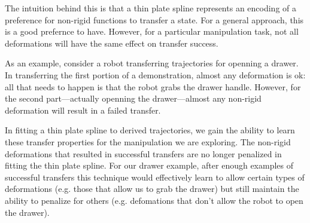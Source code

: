 The intuition behind this is that a thin plate spline represents an encoding of a preference
for non-rigid functions to transfer a state. For a general approach, this is a good
prefernce to have. However, for a particular manipulation task, not all deformations
will have the same effect on transfer success. 

As an example, consider a robot transferring
trajectories for openning a drawer. In transferring the first portion of a demonstration,
almost any deformation is ok: all that needs to happen is that the robot grabs the drawer handle.
However, for the second part---actually openning the drawer---almost any non-rigid deformation
will result in a failed transfer.

In fitting a thin plate spline to derived trajectories, we gain the ability 
to learn these transfer properties for the manipulation we are exploring.
The non-rigid deformations that resulted in successful transfers are no longer
penalized in fitting the thin plate spline. For our drawer example, after enough
examples of successful transfers this technique would effectively learn to allow
certain types of deformations (e.g. those that allow us to grab the drawer) but still
maintain the ability to penalize for others (e.g. defomations that don't allow the robot to
open the drawer).


